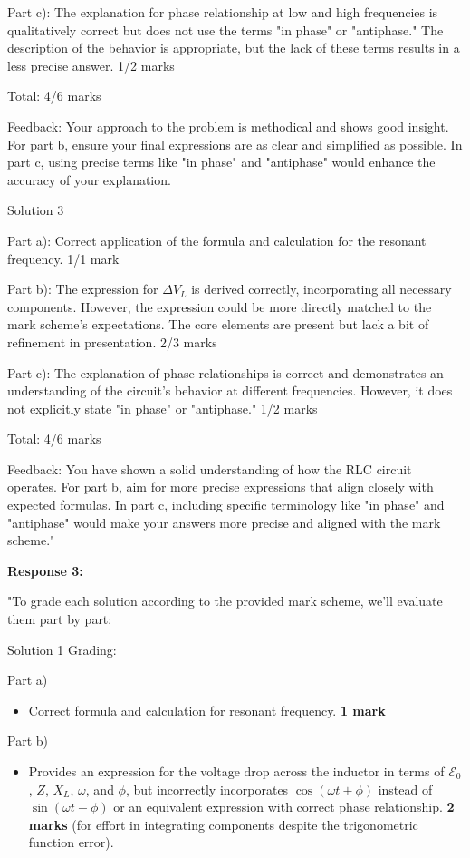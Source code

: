 \documentclass[a4paper,11pt]{article}
\begin{document}
Part c): The explanation for phase relationship at low and high frequencies is qualitatively correct but does not use the terms "in phase" or "antiphase." The description of the behavior is appropriate, but the lack of these terms results in a less precise answer. 1/2 marks

Total: 4/6 marks

Feedback: Your approach to the problem is methodical and shows good insight. For part b, ensure your final expressions are as clear and simplified as possible. In part c, using precise terms like "in phase" and "antiphase" would enhance the accuracy of your explanation.

Solution 3

Part a): Correct application of the formula and calculation for the resonant frequency. 1/1 mark

Part b): The expression for \( \Delta V_L\) is derived correctly, incorporating all necessary components. However, the expression could be more directly matched to the mark scheme's expectations. The core elements are present but lack a bit of refinement in presentation. 2/3 marks

Part c): The explanation of phase relationships is correct and demonstrates an understanding of the circuit's behavior at different frequencies. However, it does not explicitly state "in phase" or "antiphase." 1/2 marks

Total: 4/6 marks

Feedback: You have shown a solid understanding of how the RLC circuit operates. For part b, aim for more precise expressions that align closely with expected formulas. In part c, including specific terminology like "in phase" and "antiphase" would make your answers more precise and aligned with the mark scheme."

\textbf{Response 3:}

"To grade each solution according to the provided mark scheme, we'll evaluate them part by part:

Solution 1 Grading:

Part a)

\begin{itemize}
    \item Correct formula and calculation for resonant frequency. \textbf{1 mark}
\end{itemize}

Part b)

\begin{itemize}
    \item Provides an expression for the voltage drop across the inductor in terms of \( \mathcal{E}_{0} \), \( Z \), \( X_{L} \), \(\omega\), and \(\phi\), but incorrectly incorporates \(\cos(\omega t + \phi)\) instead of \(\sin(\omega t - \phi)\) or an equivalent expression with correct phase relationship. \textbf{2 marks} (for effort in integrating components despite the trigonometric function error).
\end{itemize}
\end{document}
